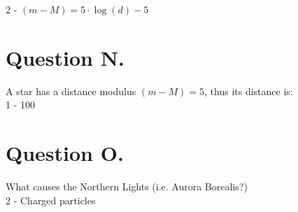\documentclass[11pt,a4paper,twoside]{article}
\begin{document}
2 - $\left( m - M \right) = 5 \cdot \log{\left( d \right)} - 5$

\section*{Question N.}

A star has a distance modulus $\left( m - M \right) = \num{5}$, thus its distance is: \\

1 - \SI{100}{\parsec}

\section*{Question O.}

What causes the Northern Lights (i.e. Aurora Borealis?) \\

2 - Charged particles
\end{document}
